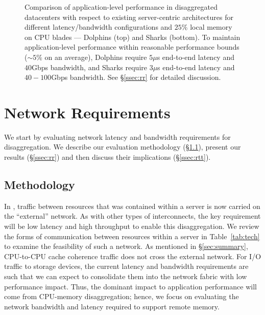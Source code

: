 %
\begin{figure}[!t]
  \centering
  \caption{\small{Comparison of application-level performance in disaggregated datacenters with respect to existing server-centric architectures for different latency/bandwidth configurations and $25\%$ local memory on CPU blades --- Dolphins (top) and Sharks (bottom). To maintain application-level performance within reasonable performance bounds ($\sim 5\%$ on an average), Dolphins require $5\mu$s end-to-end latency and $40$Gbps bandwidth, and Sharks require  $3\mu$s end-to-end latency and $40-100$Gbps bandwidth. See \S\ref{ssec:rr} for detailed discussion.}}
  \label{fig:latb}
\end{figure}
%
\vspace{-0.1in}
\section{Network Requirements}
\label{sec:requirements}
\vspace{-0.05in}
We start by evaluating network latency and bandwidth requirements for disaggregation.
We describe our evaluation methodology (\S \ref{ssec:rmethod}), present our results (\S \ref{ssec:rr}) and then discuss their implications (\S \ref{ssec:rtt}). 

\vspace{-0.1in}
\subsection{Methodology}
\label{ssec:rmethod}
\vspace{-0.05in}
In \dis, traffic between resources that was contained within a server is now carried on the ``external'' network. As with other types of interconnects, the key requirement will be low latency and high throughput to enable this disaggregation. We review the forms of communication between resources within a server in Table~\ref{tab:tech} to examine the feasibility of such a network. As mentioned in \S\ref{sec:summary}, CPU-to-CPU cache coherence traffic does not cross the external network.
For I/O traffic to storage devices, the current latency and bandwidth requirements are such that we can expect to consolidate them into the network fabric with low performance impact. 
Thus, the dominant impact to application performance will come from CPU-memory disaggregation; hence, we focus on evaluating the network bandwidth and latency required to support remote memory. 

